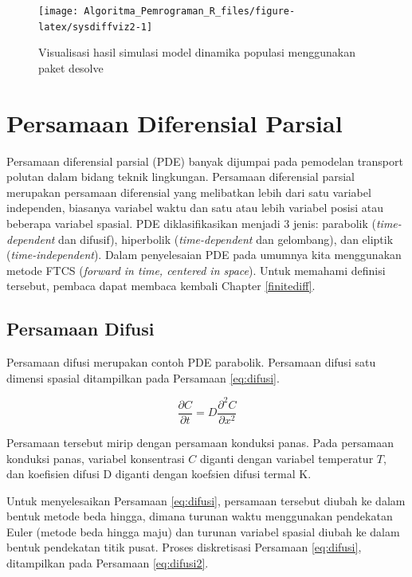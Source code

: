 \documentclass[
]{book}
\theoremstyle{definition}
\theoremstyle{definition}
\theoremstyle{definition}
\theoremstyle{definition}
\theoremstyle{remark}
\begin{document}
\begin{figure}

{\centering \texttt{[image: Algoritma\_Pemrograman\_R\_files/figure-latex/sysdiffviz2-1]} 

}

\caption{Visualisasi hasil simulasi model dinamika populasi menggunakan paket desolve}\label{fig:sysdiffviz2}
\end{figure}

\hypertarget{pasialdiff}{%
\section{Persamaan Diferensial Parsial}\label{pasialdiff}}

Persamaan diferensial parsial (PDE) banyak dijumpai pada pemodelan transport polutan dalam bidang teknik lingkungan. Persamaan diferensial parsial merupakan persamaan diferensial yang melibatkan lebih dari satu variabel independen, biasanya variabel waktu dan satu atau lebih variabel posisi atau beberapa variabel spasial. PDE diklasifikasikan menjadi 3 jenis: parabolik (\emph{time-dependent} dan difusif), hiperbolik (\emph{time-dependent} dan gelombang), dan eliptik (\emph{time-independent}). Dalam penyelesaian PDE pada umumnya kita menggunakan metode FTCS (\emph{forward in time, centered in space}). Untuk memahami definisi tersebut, pembaca dapat membaca kembali Chapter \ref{finitediff}.

\hypertarget{persamaan-difusi}{%
\subsection{Persamaan Difusi}\label{persamaan-difusi}}

Persamaan difusi merupakan contoh PDE parabolik. Persamaan difusi satu dimensi spasial ditampilkan pada Persamaan \eqref{eq:difusi}.

\begin{equation}
\frac{\partial C}{\partial t}=D\frac{\partial^2C}{\partial x^2}
  \label{eq:difusi}
\end{equation}

Persamaan tersebut mirip dengan persamaan konduksi panas. Pada persamaan konduksi panas, variabel konsentrasi \(C\) diganti dengan variabel temperatur \(T\), dan koefisien difusi D diganti dengan koefsien difusi termal K.

Untuk menyelesaikan Persamaan \eqref{eq:difusi}, persamaan tersebut diubah ke dalam bentuk metode beda hingga, dimana turunan waktu menggunakan pendekatan Euler (metode beda hingga maju) dan turunan variabel spasial diubah ke dalam bentuk pendekatan titik pusat. Proses diskretisasi Persamaan \eqref{eq:difusi}, ditampilkan pada Persamaan \eqref{eq:difusi2}.
\end{document}
